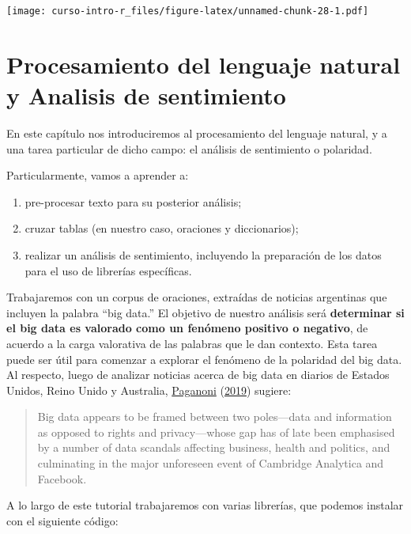 \documentclass[
]{book}
\providecommand{\tightlist}{%
  \setlength{\itemsep}{0pt}\setlength{\parskip}{0pt}}
\begin{document}
\texttt{[image: curso-intro-r\_files/figure-latex/unnamed-chunk-28-1.pdf]}

\hypertarget{procesamiento-del-lenguaje-natural-y-analisis-de-sentimiento}{%
\chapter{Procesamiento del lenguaje natural y Analisis de sentimiento}\label{procesamiento-del-lenguaje-natural-y-analisis-de-sentimiento}}

En este capítulo nos introduciremos al procesamiento del lenguaje natural, y a una tarea particular de dicho campo: el análisis de sentimiento o polaridad.

Particularmente, vamos a aprender a:

\begin{enumerate}
\def\labelenumi{\arabic{enumi}.}
\tightlist
\item
  pre-procesar texto para su posterior análisis;
\item
  cruzar tablas (en nuestro caso, oraciones y diccionarios);
\item
  realizar un análisis de sentimiento, incluyendo la preparación de los datos para el uso de librerías específicas.
\end{enumerate}

Trabajaremos con un corpus de oraciones, extraídas de noticias argentinas que incluyen la palabra ``big data.'' El objetivo de nuestro análisis será \textbf{determinar si el big data es valorado como un fenómeno positivo o negativo}, de acuerdo a la carga valorativa de las palabras que le dan contexto.
Esta tarea puede ser útil para comenzar a explorar el fenómeno de la polaridad del big data. Al respecto, luego de analizar noticias acerca de big data en diarios de Estados Unidos, Reino Unido y Australia, \protect\hyperlink{ref-Paganoni2019}{Paganoni} (\protect\hyperlink{ref-Paganoni2019}{2019}) sugiere:

\begin{quote}
Big data appears to be framed between two poles---data and information as opposed to rights and privacy---whose gap has of late been emphasised by a number of data scandals affecting business, health and politics, and culminating in the major unforeseen event of Cambridge Analytica and Facebook.
\end{quote}

A lo largo de este tutorial trabajaremos con varias librerías, que podemos instalar con el siguiente código:
\end{document}
